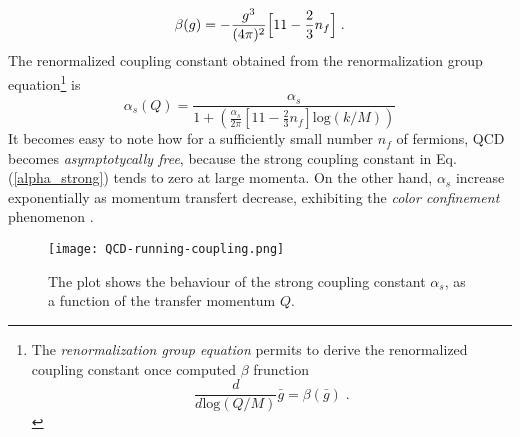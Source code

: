 \begin{equation}
\beta(g) = -\frac{g^3}{(4\pi)^2}\Bigl[11-\frac{2}{3}n_f\Bigr] \;.
\end{equation}
The renormalized coupling constant obtained from the renormalization group equation\footnote{The \emph{renormalization group equation} permits to derive the renormalized coupling constant once computed $\beta$ frunction
\begin{equation*}
\frac{d}{d\mbox{log}(Q/M)}\bar{g} = \beta(\bar{g}) \;.
\end{equation*}} is
\begin{equation}
\alpha_s(Q) = \frac{\alpha_s}{1+(\frac{\alpha_s}{2\pi}[11-\frac{2}{3}n_f]\mbox{log}(k/M))}
\label{alpha_strong}
\end{equation}
It becomes easy to note how for a sufficiently small number $n_f$ of fermions, QCD becomes \emph{asymptotycally free}, because the strong coupling constant in Eq.(\ref{alpha_strong}) tends to zero at large momenta. On the other hand, $\alpha_s$ increase exponentially as momentum transfert decrease, exhibiting the \emph{color confinement} phenomenon \cite{Peskin:1995ev}.
\begin{figure}[t]
\centering
\texttt{[image: QCD-running-coupling.png]}
\caption{The plot shows the behaviour of the strong coupling constant $\alpha_s$, as a function of the transfer momentum $Q$. }
\end{figure}

